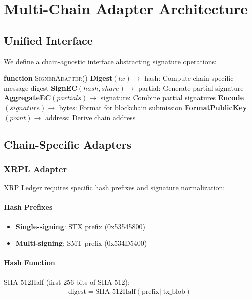\section{Multi-Chain Adapter Architecture}


\subsection{Unified Interface}

We define a chain-agnostic interface abstracting signature operations:

\begin{algorithmic}[1]
\State \textbf{function} \textsc{SignerAdapter}()
\State \textbf{Digest}$(tx) \to$ hash: Compute chain-specific message digest
\State \textbf{SignEC}$(hash, share) \to$ partial: Generate partial signature
\State \textbf{AggregateEC}$(partials) \to$ signature: Combine partial signatures
\State \textbf{Encode}$(signature) \to$ bytes: Format for blockchain submission
\State \textbf{FormatPublicKey}$(point) \to$ address: Derive chain address

\end{algorithmic}

\subsection{Chain-Specific Adapters}

\subsubsection{XRPL Adapter}

XRP Ledger requires specific hash prefixes and signature normalization:

\paragraph{Hash Prefixes}
\begin{itemize}
\item \textbf{Single-signing}: STX prefix (0x53545800)
\item \textbf{Multi-signing}: SMT prefix (0x534D5400)
\end{itemize}

\paragraph{Hash Function} SHA-512Half (first 256 bits of SHA-512):
\begin{align*}
\text{digest} = \text{SHA-512Half}(\text{prefix} || \text{tx\_blob})
\end{align*}

